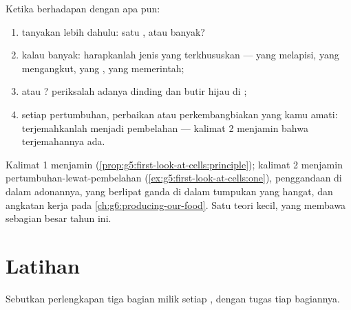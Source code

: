\begin{method}\label{met:g6:cell-unit-of-life:read}
Ketika berhadapan dengan  apa pun:
\begin{enumerate}
  \item tanyakan lebih dahulu: satu , atau banyak?
  \item kalau banyak: harapkanlah jenis yang terkhususkan --- yang
        melapisi, yang mengangkut, yang , yang memerintah;
  \item {} atau ? periksalah adanya dinding dan butir hijau
        di ;
  \item setiap pertumbuhan, perbaikan atau perkembangbiakan yang kamu
        amati: terjemahkanlah menjadi pembelahan  --- kalimat 2
        menjamin bahwa terjemahannya ada.
\end{enumerate}
\end{method}

\begin{example}\label{ex:g6:cell-unit-of-life:atwork}
Kalimat 1 menjamin 
(\cref{prop:g5:first-look-at-cells:principle}); kalimat 2 menjamin
pertumbuhan-lewat-pembelahan
(\cref{ex:g5:first-look-at-cells:one}), penggandaan  di dalam
adonannya,  yang berlipat ganda di dalam tumpukan yang hangat,
dan angkatan kerja  pada
\cref{ch:g6:producing-our-food}. Satu teori kecil, yang membawa
sebagian besar  tahun ini.
\end{example}

\section{Latihan}

\begin{exercise}[$\star$]\label{exo:g6:cell-unit-of-life:1}
Sebutkan perlengkapan tiga bagian milik setiap , dengan tugas tiap
bagiannya.
\end{exercise}


